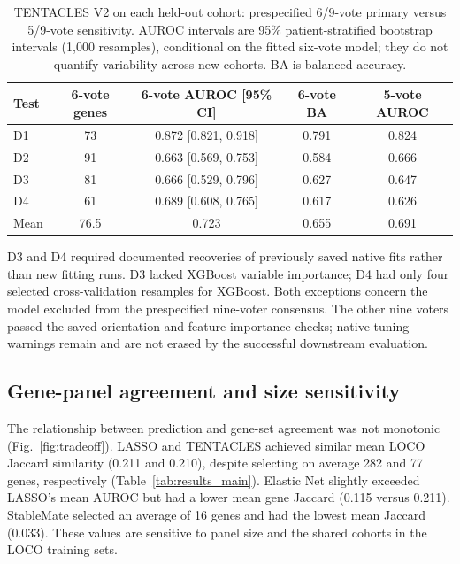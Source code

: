 \begin{table}[!t]
\caption{TENTACLES V2 on each held-out cohort: prespecified 6/9-vote primary versus 5/9-vote sensitivity. AUROC intervals are 95\% patient-stratified bootstrap intervals (1,000 resamples), conditional on the fitted six-vote model; they do not quantify variability across new cohorts. BA is balanced accuracy.}
\label{tab:tentacles_sensitivity}
\centering\footnotesize
\setlength{\tabcolsep}{2.9pt}
\renewcommand{\arraystretch}{1.1}
\begin{tabular}{@{}lcccc@{}}
\toprule
Test & 6-vote genes & 6-vote AUROC [95\% CI] & 6-vote BA & 5-vote AUROC\\
\midrule
D1 & 73 & 0.872 [0.821, 0.918] & 0.791 & 0.824\\
D2 & 91 & 0.663 [0.569, 0.753] & 0.584 & 0.666\\
D3 & 81 & 0.666 [0.529, 0.796] & 0.627 & 0.647\\
D4 & 61 & 0.689 [0.608, 0.765] & 0.617 & 0.626\\
\midrule
Mean & 76.5 & 0.723 & 0.655 & 0.691\\
\bottomrule
\end{tabular}
\end{table}

D3 and D4 required documented recoveries of previously saved native fits rather than new fitting runs. D3 lacked XGBoost variable importance; D4 had only four selected cross-validation resamples for XGBoost. Both exceptions concern the model excluded from the prespecified nine-voter consensus. The other nine voters passed the saved orientation and feature-importance checks; native tuning warnings remain and are not erased by the successful downstream evaluation.

\subsection{Gene-panel agreement and size sensitivity}
\label{sec:results_genes}
The relationship between prediction and gene-set agreement was not monotonic (Fig.~\ref{fig:tradeoff}). LASSO and TENTACLES achieved similar mean LOCO Jaccard similarity (0.211 and 0.210), despite selecting on average 282 and 77 genes, respectively (Table~\ref{tab:results_main}). Elastic Net slightly exceeded LASSO's mean AUROC but had a lower mean gene Jaccard (0.115 versus 0.211). StableMate selected an average of 16 genes and had the lowest mean Jaccard (0.033). These values are sensitive to panel size and the shared cohorts in the LOCO training sets.

